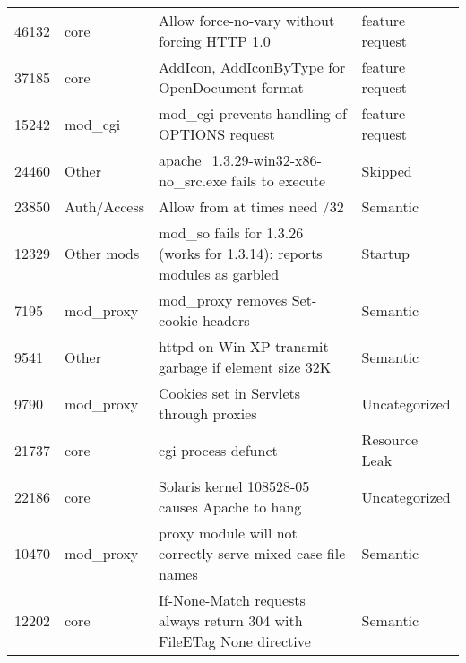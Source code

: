 \begin{longtable}[c]{llll}
46132  & core               & Allow force-no-vary without forcing HTTP 1.0                                                                   & feature request   \\
37185  & core               & AddIcon, AddIconByType for OpenDocument format                                                                 & feature request   \\
15242  & mod\_cgi           & mod\_cgi prevents handling of OPTIONS request                                                                  & feature request   \\
24460  & Other              & apache\_1.3.29-win32-x86-no\_src.exe fails to execute                                                          & Skipped           \\
23850  & Auth/Access        & Allow from at times need /32                                                                                   & Semantic          \\
12329  & Other mods         & mod\_so fails for 1.3.26 (works for 1.3.14): reports modules as garbled                                        & Startup           \\
7195   & mod\_proxy         & mod\_proxy removes Set-cookie headers                                                                          & Semantic          \\
9541   & Other              & httpd on Win XP transmit garbage if element size 32K                                               & Semantic          \\
9790   & mod\_proxy         & Cookies set in Servlets through proxies                                                                        & Uncategorized     \\
21737  & core               & cgi process defunct                                                                                            & Resource Leak     \\
22186  & core               & Solaris kernel 108528-05 causes Apache to hang                                                                 & Uncategorized     \\
10470  & mod\_proxy         & proxy module will not correctly serve mixed case file names                                                    & Semantic          \\
12202  & core               & If-None-Match requests always return 304 with FileETag None directive                                          & Semantic          \\

\end{longtable}
